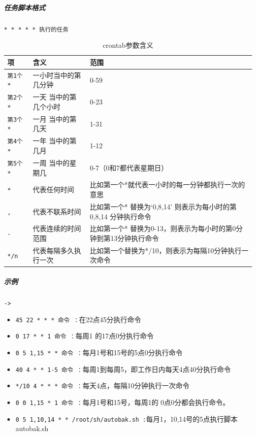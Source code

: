 \documentclass[UTF8,a4paper,12pt]{ctexbook}
\begin{document}
				\subparagraph{任务脚本格式}\verb|* * * * * 执行的任务|
					\begin{table}[H]
						\centering
						\caption{crontab参数含义}
						\begin{tabular}{p{3cm}<{\centering}|p{5cm}<{\centering}|p{6cm}<{\centering}}
							\toprule[1.5pt]
							项	   	   & 含义 & 范围\\
							\hline
							\verb|第1个* |&一小时当中的第几分钟  &0-59 \\
							\verb|第2个* |&一天 当中的第几个小时 &0-23 \\
							\verb|第3个* |&一月 当中的第几天  &1-31 \\
							\verb|第4个* |&一年 当中的第几月  &1-12 \\
							\verb|第5个* |&一周 当中的星期几  &0-7（0和7都代表星期日） \\
							\verb|*|& 代表任何时间 &比如第一个*就代表一小时的每一分钟都执行一次的意思\\
							\verb|,|& 代表不联系时间 &比如第一个* 替换为‘0,8,14’ 则表示为每小时的第0,8,14 分钟执行命令\\
							\verb|-|& 代表连续的时间范围 &比如第一个* 替换为0-13，则表示为每小时的第0分钟到第13分钟执行命令\\
							\verb|*/n|& 代表每隔多久执行一次 &比如第一个替换为*/10，则表示为每隔10分钟执行一次命令\\
							\bottomrule[1.5pt]
						\end{tabular}
					\end{table}	
				
				\subparagraph{示例}\verb|->|	
					\begin{itemize}[itemindent =1em]
						\item \verb|45 22 * * * 命令 ：|在22点45分执行命令 
						\item \verb|0 17 * * 1 命令 ：|每周1 的17点0分执行命令
						\item \verb|0 5 1,15 * * 命令 ：|每月1号和15号的5点0分执行命令
						\item \verb|40 4 * * 1-5 命令 ：|每周1到每周5，即工作日内每天4点40分执行命令
						\item \verb|*/10 4 * * * 命令 ：|每天4点，每隔10分钟执行一次命令
						\item \verb|0 0 1,15 * 1 命令 ：|每月1号和15号，每周1的 0点0分都会执行命令。
						\item \verb|0 5 1,10,14 * * /root/sh/autobak.sh :|每月1，10,14号的5点执行脚本autobak.sh
					\end{itemize}
				
\end{document}
